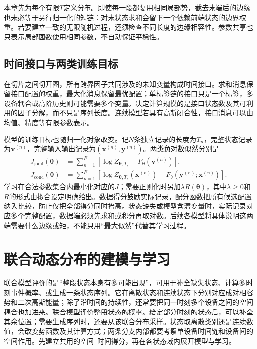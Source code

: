 本章先为每个有限$T$定义分布。即使每一段都复用相同局部势，截去末端后的边缘也未必等于另行归一化的短链：对末状态求和会留下一个依赖前端状态的边界权重。若要建立一致的无限随机过程，还须检查不同长度的边缘相容性。参数共享也只表示局部函数使用相同参数，不自动保证平稳性。

\subsection{时间接口与两类训练目标}
\label{sec:pgm-dynamic-undirected-targets}

在切片之间切开图，所有跨界因子共同涉及的未知变量构成时间接口。求和消息保留接口配置的权重，最大化消息保留最优配置；单标签链的接口只是一个标签，多设备耦合或高阶历史则可能需要多个变量。决定计算规模的是接口状态数及其可利用的因子分解，而不只是序列长度。连续模型若具有高斯闭合性，接口消息可以由均值、精度等有限参数表示。

模型的训练目标也随归一化对象改变。记$N$条独立记录的长度为$T_n$，完整状态记录为$\bm v^{(n)}$，完整输入输出记录为$(\bm x^{(n)},\bm y^{(n)})$。两类负对数似然分别是
\begin{equation}
  \begin{aligned}
    J_{\mathrm{joint}}(\bm\theta)
      &=\sum_{n=1}^{N}
        [\log Z_{\bm\theta,T_n}-F_{\bm\theta}(\bm v^{(n)})],\\
    J_{\mathrm{cond}}(\bm\theta)
      &=\sum_{n=1}^{N}
        [\log Z_{\bm\theta,T_n}(\bm x^{(n)})
          -F_{\bm\theta}(\bm y^{(n)};\bm x^{(n)})].
  \end{aligned}
  \label{eq:pgm-dynamic-undirected-objectives}
\end{equation}
学习在合法参数集合内最小化对应的$J$；需要正则化时另加$\lambda R(\bm\theta)$，其中$\lambda\geq0$和$R$的形式由拟合设定明确给出。数据得分鼓励实际记录，配分函数把所有候选配置纳入比较，防止仅把全部得分同时抬高。状态缺失或模型含潜变量时，实际记录对应多个完整配置，数据端必须先求和或积分再取对数。后续各模型将具体说明这两端需要什么边缘或矩，不能只用“最大似然”代替其学习过程。

\section{联合动态分布的建模与学习}
\label{sec:pgm-dynamic-undirected-joint-models}

联合模型评价的是“整段状态本身有多可能出现”，可用于补全缺失状态、计算多时刻事件概率、或生成一条状态序列。它在离散状态和连续状态下分别对应成对相容势和二次高斯能量；除了沿时间的持续性，还常要把同一时刻多个设备之间的空间耦合也加进来。联合模型评价整段状态的概率。给定部分时刻的状态后，可以补全其余位置；需要生成序列时，还要从该联合分布采样。状态取离散类别还是连续数值，会改变势函数及其计算方式；两条分支内部都要考察单设备时间链和设备间的空间作用。先建立共用的空间--时间得分，再在各状态域内展开模型与学习。

